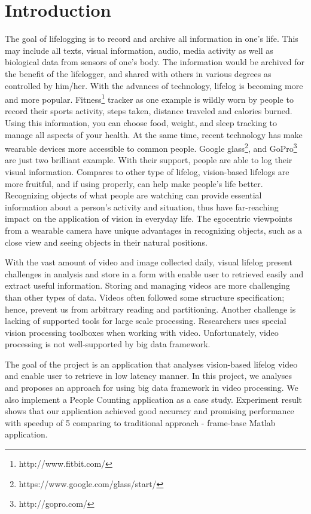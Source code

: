 \section{Introduction}
\label{sec:sec_intro}

The goal of lifelogging is to record and archive all information in one's life. 
This may include all texts, visual information, audio, media activity as well 
as biological data from sensors of one's body. The information would be archived
for the benefit of the lifelogger, and shared with others in various degrees as
controlled by him/her.  With the advances of technology, lifelog is becoming more
 and more popular. Fitness\footnote{http://www.fitbit.com/} tracker as one
 example is wildly worn by people to record  their sports activity, steps taken, distance traveled and calories
 burned.  Using this information, you can choose food, weight, and sleep
 tracking  to manage all aspects of your health.  At the same time, recent 
 technology has make wearable devices more accessible to common people. Google
 glass\footnote{https://www.google.com/glass/start/}, and
 GoPro\footnote{http://gopro.com/} are just two brilliant example. With their support, people are able to log their visual information.
Compares to other type of lifelog, vision-based lifelogs are more fruitful, and
if using properly, can help make people's life better. Recognizing objects of 
what people are watching can provide essential information about a person's 
activity and situation, thus have far-reaching impact on the application of 
vision in everyday life. The egocentric viewpoints from a wearable camera have
unique advantages in recognizing objects, such as a close view and seeing
objects in their natural positions.

With the vast amount of video and image collected daily, visual lifelog present 
challenges in analysis and store in a form with enable user to retrieved easily 
and extract useful information. Storing and managing videos are more challenging
than other types of data. Videos often followed some structure specification;
hence, prevent us from arbitrary reading and partitioning. Another challenge
is lacking of supported tools for large scale processing. Researchers uses
special vision processing toolboxes when working with video. Unfortunately,
video processing is not well-supported by big data framework.

The goal of the project is an application that 
analyses vision-based lifelog video and enable user to retrieve in low
latency manner. In this project, we analyses and proposes an approach for using
big data framework in video processing. We also implement a People Counting
application as a case study. Experiment result shows that our application
achieved good accuracy and promising performance with speedup of 5 comparing to
traditional approach - frame-base Matlab application.

